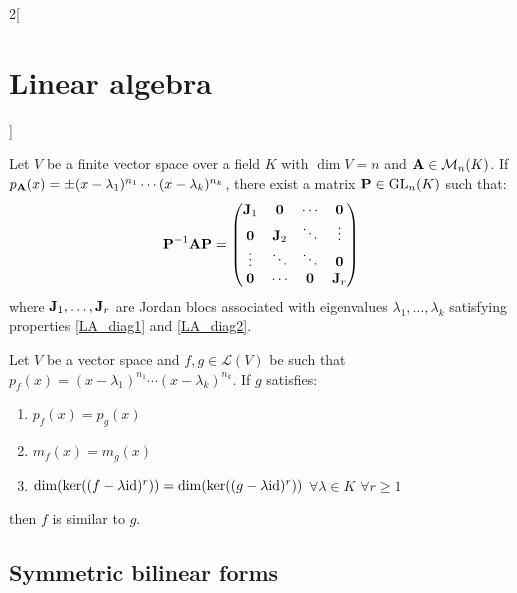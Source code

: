 \documentclass[../../../main.tex]{subfiles}
\begin{document}
\begin{multicols}{2}[\section{Linear algebra}]
\begin{prop}
\begin{enumerate}
    \end{enumerate}
  \end{prop}
  \begin{prop}
    Let $V$ be a finite vector space over a field $K$ with $\dim V=n$ and $\boldsymbol{\mathrm{A}}\in\mathcal{M}_n(K)$. If $p_{\boldsymbol{\mathrm{A}}}(x)=\pm(x-\lambda_1)^{n_1}\cdots(x-\lambda_k)^{n_k}$, there exist a matrix $\boldsymbol{\mathrm{P}}\in\mathrm{GL}_n(K)$ such that:
    $$\boldsymbol{\mathrm{P}}^{-1}\boldsymbol{\mathrm{A}}\boldsymbol{\mathrm{P}}=
      \begin{pmatrix}
        \boldsymbol{\mathrm{J}}_1 & \boldsymbol{\mathrm{0}}   & \cdots             & \boldsymbol{\mathrm{0}}   \\
        \boldsymbol{\mathrm{0}}   & \boldsymbol{\mathrm{J}}_2 & \ddots             & \vdots               \\
        \vdots               & \ddots               & \ddots             & \boldsymbol{\mathrm{0}}   \\
        \boldsymbol{\mathrm{0}}   & \cdots               & \boldsymbol{\mathrm{0}} & \boldsymbol{\mathrm{J}}_r \\
      \end{pmatrix}
    $$
    where $\boldsymbol{\mathrm{J}}_1,\ldots,\boldsymbol{\mathrm{J}}_r$ are Jordan blocs associated with eigenvalues $\lambda_1,\ldots,\lambda_k$ satisfying properties \ref{LA_diag1} and \ref{LA_diag2}.
  \end{prop}
  \begin{theorem}
    Let $V$ be a vector space and $f,g\in\mathcal{L}(V)$ be such that $p_f(x)=(x-\lambda_1)^{n_1}\cdots(x-\lambda_k)^{n_k}$. If $g$ satisfies:
    \begin{enumerate}
      \item $p_f(x)=p_g(x)$
      \item $m_f(x)=m_g(x)$
      \item $\dim(\ker((f-\lambda \mathrm{id})^r))=\dim(\ker((g-\lambda \mathrm{id})^r))$ $\forall\lambda\in K$ $\forall r\geq 1$
    \end{enumerate}
    then $f$ is similar to $g$.
  \end{theorem}
  \subsection{Symmetric bilinear forms}

\end{multicols}
\end{document}
